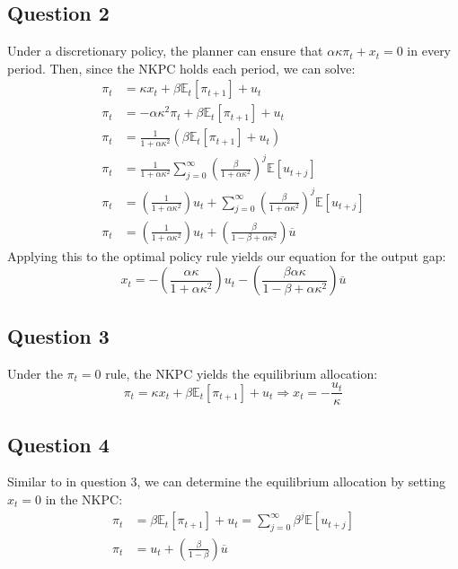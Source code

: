 \documentclass{article}
\newcommand{\E}[1]{\mathbb{E}\left[#1\right]} %
\newcommand{\Et}[1]{\mathbb{E}_t\left[#1\right]}
\begin{document}

\subsection*{Question 2}
Under a discretionary policy, the planner can ensure that ${\alpha\kappa\pi_t + x_t = 0}$ in every period. Then, since the NKPC holds each period, we can solve:
\begin{align*}
	\pi_t 	&= \kappa x_t + \beta\Et{\pi_{t+1}} + u_t																						\\
	\pi_t	&= -\alpha\kappa^2\pi_t + \beta\Et{\pi_{t+1}} + u_t																				\\
	\pi_t	&= \frac{1}{1 + \alpha\kappa^2}\left(\beta\Et{\pi_{t+1}} + u_t\right)															\\
	\pi_t	&= \frac{1}{1 + \alpha\kappa^2}\sum_{j=0}^\infty \left(\frac{\beta}{1 + \alpha\kappa^2}\right)^j\E{u_{t+j}}						\\
	\pi_t	&= \left(\frac{1}{1 + \alpha\kappa^2}\right)u_t + \sum_{j=0}^\infty \left(\frac{\beta}{1 + \alpha\kappa^2}\right)^j\E{u_{t+j}}	\\
	\pi_t	&= \left(\frac{1}{1 + \alpha\kappa^2}\right)u_t + \left(\frac{\beta}{1 -\beta + \alpha\kappa^2}\right)\overline{u}
\end{align*}
Applying this to the optimal policy rule yields our equation for the output gap:
\[
	x_t = -\left(\frac{\alpha\kappa}{1 + \alpha\kappa^2}\right)u_t - \left(\frac{\beta\alpha\kappa}{1 -\beta + \alpha\kappa^2}\right)\overline{u}
\]




\subsection*{Question 3}
Under the $\pi_t=0$ rule, the NKPC yields the equilibrium allocation:
\[
	\pi_t = \kappa x_t + \beta\Et{\pi_{t+1}} + u_t \Rightarrow x_t = -\frac{u_t}{\kappa}
\]




\subsection*{Question 4}
Similar to in question 3, we can determine the equilibrium allocation by setting ${x_t=0}$ in the NKPC:
\begin{align*}
	\pi_t &= \beta\Et{\pi_{t+1}} + u_t = \sum_{j=0}^\infty\beta^j\E{u_{t+j}}	\\
	\pi_t &= u_t + \left(\frac{\beta}{1-\beta}\right)\overline{u}
\end{align*}
\end{document}
